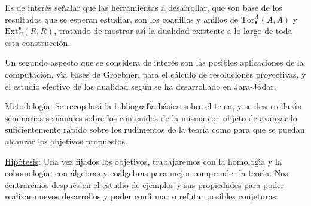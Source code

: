 \documentclass[a4paper,12pt]{article}
\begin{document}
Es de inter\'{e}s se\~{n}alar que las herramientas a desarrollar, que son base de los resultados que se esperan estudiar, son los coanillos y anillos de $\mathrm{Tor}^A_\bullet(A,A)$ y $\mathrm{Ext}_C^\bullet(R,R)$, tratando de mostrar as\'{\i} la dualidad existente a lo largo de toda esta construcci\'{o}n.

Un segundo aspecto que se considera de inter\'{e}s son las posibles aplicaciones de la computaci\'{o}n, v\'{\i}a bases de Groebner, para el c\'{a}lculo de resoluciones proyectivas, y el estudio efectivo de las dualidad seg\'{u}n se ha desarrollado en Jara-J\'{o}dar.

\medskip

\underline{Metodolog\'{\i}a}:
Se recopilar\'{a} la bibliograf\'{\i}a b\'{a}sica sobre el tema, y se desarrollar\'{a}n seminarios semanales sobre los contenidos de la misma con objeto de avanzar lo suficientemente r\'{a}pido sobre los rudimentos de la teor\'{\i}a como para que se puedan alcanzar los objetivos propuestos.

\medskip

\underline{Hip\'{o}tesis}:
Una vez fijados los objetivos, trabajaremos con la homolog\'{\i}a y la cohomolog\'{\i}a, con \'{a}lgebras y co\'{a}lgebras para mejor comprender la teor\'{\i}a. Nos centraremos despu\'{e}s en el estudio de ejemplos y sus propiedades para poder realizar nuevos desarrollos y poder confirmar o refutar posibles conjeturas.

\bigskip
\end{document}
